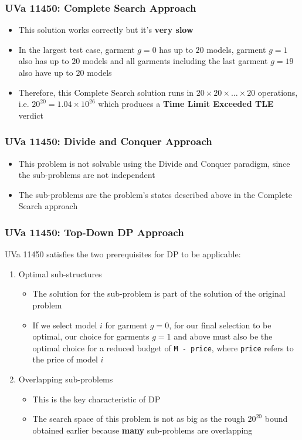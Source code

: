 \documentclass{beamer}
\begin{document}
\begin{frame}[fragile]
\frametitle{UVa 11450: Complete Search Approach}

\begin{itemize}
    \item This solution works correctly but it's \textbf{very slow}
    \item In the largest test case, garment $g = 0$ has up to $20$ models, garment $g = 1$ also has up to $20$ models and all garments including the last garment $g = 19$ also have up to $20$ models
    \item Therefore, this Complete Search solution runs in $20\times 20\times \ldots \times 20$ operations, i.e. $20^{20} = 1.04\times 10^{26}$ which produces a \textbf{Time Limit Exceeded TLE} verdict
\end{itemize}
\end{frame}


\begin{frame}[fragile]
\frametitle{UVa 11450: Divide and Conquer Approach}

\begin{itemize}
    \item This problem is not solvable using the Divide and Conquer paradigm, since the sub-problems are not independent
    \item The sub-problems are the problem's states described above in the \color{blue}Complete Search approach\color{black}
\end{itemize}
\end{frame}

\begin{frame}[fragile]
\frametitle{UVa 11450: Top-Down DP Approach}

UVa 11450 satisfies the two prerequisites for DP to be applicable:

\begin{enumerate}
    \item \color{blue}Optimal sub-structures\color{black}
	
	\begin{itemize}
	    \item The solution for the sub-problem is part of the solution of the original problem
	    \item If we select model $i$ for garment $g = 0$, for our final selection to be optimal, our choice for garments $g = 1$ and above must also be the optimal choice for a reduced budget of \verb|M - price|, where \verb|price| refers to the price of model $i$
	\end{itemize}
	
	\pause
    \item \color{blue}Overlapping sub-problems\color{black}
    	\begin{itemize}
		    \item This is the key characteristic of DP
		    \item The search space of this problem is not as big as the rough $20^{20}$ bound obtained earlier because \textbf{many} sub-problems are overlapping
		\end{itemize}
\end{enumerate}

\end{frame}
\end{document}
